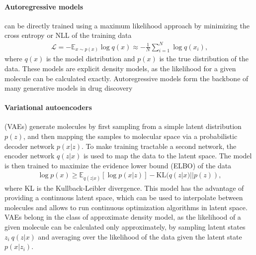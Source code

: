 \paragraph{Autoregressive models} can be directly trained using a maximum likelihood approach by
minimizing the cross entropy or \ac{NLL} of the training data
\begin{align}
      \mathcal{L} = - \mathbb{E}_{x \sim p(x)} \log q(x) \approx - \frac{1}{N} \sum_{i=1}^N \log q(x_i),
\end{align}
where $q(x)$ is the model distribution and $p(x)$ is the true distribution of the data. These models
are explicit density models, as the likelihood for a given molecule can be calculated exactly.
Autoregressive models form the backbone of many generative models in drug discovery
\citep{gomez-bombarelliAutomaticChemicalDesign2018,seglerGeneratingFocusedMolecule2018,olivecronaMolecularDenovoDesign2017,guoAugmentedMemoryCapitalizing2023,thomasAugmentedHillClimbIncreases2022,jaquesSequenceTutorConservative2016}

\paragraph{Variational autoencoders} (VAEs) \citep{kingmaAutoEncodingVariationalBayes2013} generate molecules by first
sampling from a simple latent distribution $p(z)$, and then mapping the samples to molecular space
via a probabilistic decoder network $p(x|z)$. To make training tractable a second network, the
encoder network $q(z|x)$ is used to map the data to the latent space. The model is then trained to
maximize the evidence lower bound (ELBO) of the data
\begin{align}
      \log p(x) \geq \mathbb{E}_{q(z|x)}[\log p(x|z)] - \text{KL}(q(z|x) || p(z)),
\end{align}
where KL is the Kullback-Leibler divergence. This model has the advantage of providing a continuous
latent space, which can be used to interpolate between molecules and allows to run continuous
optimization algorithms in latent space. VAEs belong in the class of approximate density model, as
the likelihood of a given molecule can be calculated only approximately, by sampling latent states
$z_i ~ q(z|x)$ and averaging over the likelihood of the data given the latent state $p(x|z_i)$.

